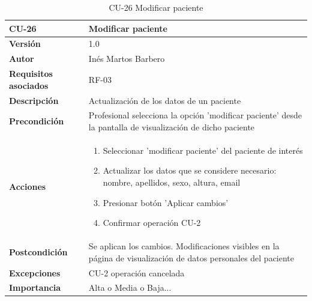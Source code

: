 \begin{table}[p]
	\centering
	\begin{tabularx}{\linewidth}{ p{} p{} }
		\toprule
		\textbf{CU-26}    & \textbf{Modificar paciente}\\
		\toprule
		\textbf{Versión}              & 1.0    \\
		\textbf{Autor}                & Inés Martos Barbero \\
		\textbf{Requisitos asociados} & RF-03 \\
		\textbf{Descripción}          & Actualización de los datos de un paciente \\
		\textbf{Precondición}         & Profesional selecciona la opción 'modificar paciente' desde la pantalla de visualización de dicho paciente \\
		\textbf{Acciones}             &
		\begin{enumerate}
			\def\labelenumi{\arabic{enumi}.}
			\tightlist
			\item Seleccionar 'modificar paciente' del paciente de interés
			\item Actualizar los datos que se considere necesario: nombre, apellidos, sexo, altura, email
            \item Presionar botón 'Aplicar cambios'
            \item Confirmar operación CU-2
		\end{enumerate}\\
		\textbf{Postcondición}        & Se aplican los cambios. Modificaciones visibles en la página de visualización de datos personales del paciente \\
		\textbf{Excepciones}          & CU-2 operación cancelada \\
		\textbf{Importancia}          & Alta o Media o Baja... \\
		\bottomrule
	\end{tabularx}
	\caption{CU-26 Modificar paciente}
    \label{CU-26}
\end{table}

